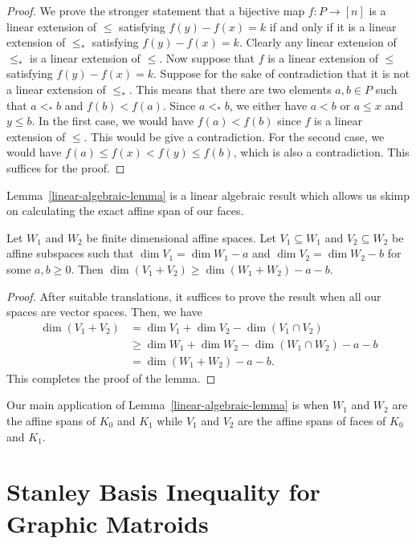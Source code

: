 \documentclass{puthesis-UG}
\begin{document}
\begin{proof}
    We prove the stronger statement that a bijective map $f : P \to [n]$ is a linear extension of $\leq$ satisfying $f(y) - f(x) = k$ if and only if it is a linear extension of $\leq_*$ satisfying $f(y) - f(x) = k$. Clearly any linear extension of $\leq_*$ is a linear extension of $\leq$. Now suppose that $f$ is a linear extension of $\leq$ satisfying $f(y) - f(x) = k$. Suppose for the sake of contradiction that it is not a linear extension of $\leq_*$. This means that there are two elements $a, b \in P$ such that $a <_* b$ and $f(b) < f(a)$. Since $a <_* b$, we either have $a < b$ or $a \leq x$ and $y \leq b$. In the first case, we would have $f(a) < f(b)$ since $f$ is a linear extension of $\leq$. This would be give a contradiction. For the second case, we would have $f(a) \leq f(x) < f(y)\leq f(b)$, which is also a contradiction. This suffices for the proof. 
\end{proof}

Lemma~\ref{linear-algebraic-lemma} is a linear algebraic result which allows us skimp on calculating the exact affine span of our faces. 

\begin{lem} \label{linear-algebraic-lemma}
    Let $W_1$ and $W_2$ be finite dimensional affine spaces. Let $V_1 \subseteq W_1$ and $V_2 \subseteq W_2$ be affine subspaces such that $\dim V_1 = \dim W_1 - a$ and $\dim V_2 = \dim W_2 - b$ for some $a, b \geq 0$. Then $\dim (V_1 + V_2) \geq \dim (W_1 + W_2) - a - b$. 
\end{lem}

\begin{proof}
    After suitable translations, it suffices to prove the result when all our spaces are vector spaces. Then, we have 
    \begin{align*}
        \dim (V_1 + V_2) & = \dim V_1 + \dim V_2 - \dim (V_1 \cap V_2) \\
        & \geq \dim W_1 + \dim W_2 - \dim (W_1 \cap W_2) - a - b \\
        & = \dim (W_1 + W_2) - a - b. 
    \end{align*}
    This completes the proof of the lemma. 
\end{proof}

Our main application of Lemma~\ref{linear-algebraic-lemma} is when $W_1$ and $W_2$ are the affine spans of $K_0$ and $K_1$ while $V_1$ and $V_2$ are the affine spans of faces of $K_0$ and $K_1$. 

\section{Stanley Basis Inequality for Graphic Matroids}
\end{document}
